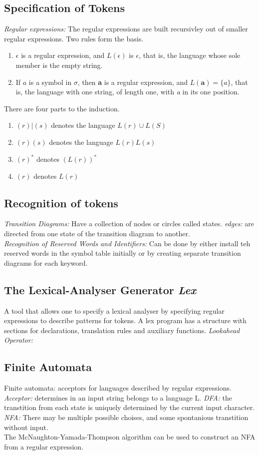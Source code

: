 \subsection{Specification of Tokens}
\emph{Regular expressions:} The regular expressions are built recursivley out of smaller regular expressions. Two rules form the basis.
\begin{enumerate}
	\item{$\epsilon$ is a regular expression, and $L(\epsilon)$ is ${\epsilon}$, that is, the language whose sole member is the empty string.}
	\item{If $a$ is a symbol in $\sigma$, then \textbf{a} is a regular expression, and $L(\textbf{a}) = \{a\}$, that is, the language with one string, of length one, with \emph{a} in its one position.}
\end{enumerate}  
There are four parts to the induction. 
\begin{enumerate}
	\item{$(r)|(s)$ denotes the language $L(r)\cup L(S)$}
	\item{$(r)(s)$ denotes the language $L(r)L(s)$}
	\item{$(r)^*$ denotes $(L(r))^*$}
	\item{$(r)$ denotes $L(r)$}
\end{enumerate}

\subsection{Recognition of tokens}
\emph{Transition Diagrams:} Have a collection of nodes or circles called states. \emph{edges:} are directed from one state of the transition diagram to another. \\
\emph{Recognition of Reserved Words and Identifiers:} Can be done by either install teh reserved words in the symbol table initially or by creating separate transition diagrams for each keyword.

\subsection{The Lexical-Analyser Generator \emph{Lex}}
A tool that allows one to specify a lexical analyser by specifying regular expressions to describe patterns for tokens. A lex program has a structure with sections for declarations, translation rules and auxiliary functions. \emph{Lookahead Operator:} 
\subsection{Finite Automata}
Finite automata: acceptors for languages described by regular expressions. \emph{Acceptor:} determines in an input string belongs to a language L. \emph{DFA:} the transtition from each state is uniquely determined by the current input character. \emph{NFA:} There may be multiple possible choises, and some spontanious transtition without input.\\
The McNaughton-Yamada-Thompson algorithm can be used to construct an NFA from a regular expression. 
